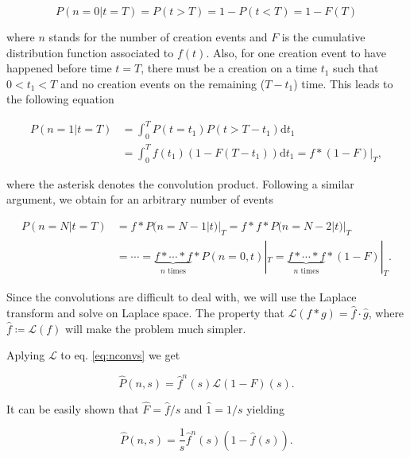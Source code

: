 \begin{equation*}
P(n=0|t=T) = P(t>T) = 1 - P(t<T) = 1 - F(T)
\end{equation*}

where $n$ stands for the number of creation events and $F$ is the cumulative distribution function associated to $f(t)$. Also, for one creation event to have happened before time $t=T$, there must be a creation on a time $t_1$ such that $0<t_1<T$ and no creation events on the remaining ($T-t_1$) time. This leads to the following equation

\begin{equation*}
  \begin{split}
    P(n=1|t=T) &= \int_0^TP(t=t_1)P(t>T-t_1)\mathrm{d}t_1 \\
    &= \int_0^Tf(t_1)(1-F(T-t_1))\mathrm{d}t_1=f\ast (1-F)|_T,
  \end{split}
\end{equation*}

where the asterisk denotes the convolution product. Following a similar argument, we obtain for an arbitrary number of events


\begin{equation}
  \label{eq:nconvs}
  \begin{split}
    P(n=N|t=T) &= f\ast P(n=N-1|t)|_T = f\ast f\ast P(n=N-2|t)|_T \\
    &= \cdots = \underbrace{f\ast\cdots\ast f}_{n \text{ times}}\ast P(n=0,t)|_T = \underbrace{f\ast\cdots\ast f}_{n \text{ times}}\ast (1-F)|_T.
  \end{split}
\end{equation}

Since the convolutions are difficult to deal with, we will use the Laplace transform and solve on Laplace space. The property that $\mathcal{L}(f\ast g) = \hat{f}\cdot\hat{g}$, where $\hat{f}\coloneqq\mathcal{L}(f)$ will make the problem much simpler.

Aplying $\mathcal{L}$ to eq. \eqref{eq:nconvs} we get

\begin{equation*}
  \hat{P}(n,s) = \hat{f}^n(s)\mathcal{L}(1-F)(s).
\end{equation*}

It can be easily shown that $\hat{F} = \hat{f}/s$ and $\hat{1} = 1/s$ yielding

\begin{equation}
  \label{eq:lapP}
  \hat{P}(n,s) = \frac{1}{s}\hat{f}^n(s)(1-\hat{f}(s)).
\end{equation}

